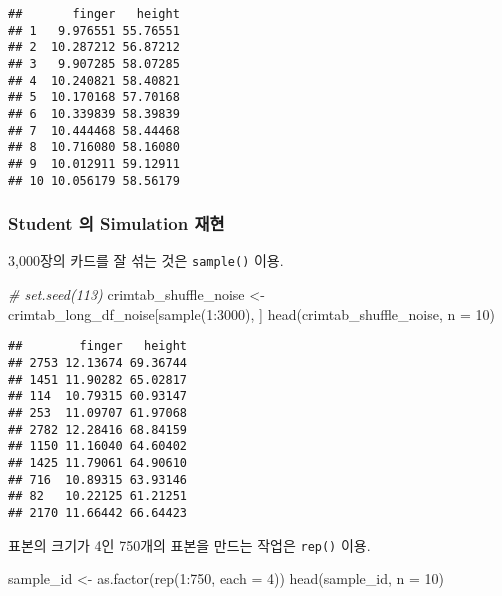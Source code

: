 \documentclass[
]{article}
\newenvironment{Shaded}{\begin{snugshade}}{\end{snugshade}}
\newcommand{\AttributeTok}[1]{\textcolor[rgb]{0.77,0.63,0.00}{#1}}
\newcommand{\CommentTok}[1]{\textcolor[rgb]{0.56,0.35,0.01}{\textit{#1}}}
\newcommand{\DecValTok}[1]{\textcolor[rgb]{0.00,0.00,0.81}{#1}}
\newcommand{\FunctionTok}[1]{\textcolor[rgb]{0.00,0.00,0.00}{#1}}
\newcommand{\NormalTok}[1]{#1}
\newcommand{\OtherTok}[1]{\textcolor[rgb]{0.56,0.35,0.01}{#1}}
\newcommand{\SpecialCharTok}[1]{\textcolor[rgb]{0.00,0.00,0.00}{#1}}
\begin{document}
\begin{verbatim}
##       finger   height
## 1   9.976551 55.76551
## 2  10.287212 56.87212
## 3   9.907285 58.07285
## 4  10.240821 58.40821
## 5  10.170168 57.70168
## 6  10.339839 58.39839
## 7  10.444468 58.44468
## 8  10.716080 58.16080
## 9  10.012911 59.12911
## 10 10.056179 58.56179
\end{verbatim}

\hypertarget{student-uxc758-simulation-uxc7acuxd604}{%
\subsubsection{Student 의 Simulation
재현}\label{student-uxc758-simulation-uxc7acuxd604}}

3,000장의 카드를 잘 섞는 것은 \texttt{sample()} 이용.

\begin{Shaded}
\begin{Highlighting}[]
\CommentTok{\# set.seed(113)}
\NormalTok{crimtab\_shuffle\_noise }\OtherTok{\textless{}{-}} 
\NormalTok{  crimtab\_long\_df\_noise[}\FunctionTok{sample}\NormalTok{(}\DecValTok{1}\SpecialCharTok{:}\DecValTok{3000}\NormalTok{), ]}
\FunctionTok{head}\NormalTok{(crimtab\_shuffle\_noise, }\AttributeTok{n =} \DecValTok{10}\NormalTok{)}
\end{Highlighting}
\end{Shaded}

\begin{verbatim}
##        finger   height
## 2753 12.13674 69.36744
## 1451 11.90282 65.02817
## 114  10.79315 60.93147
## 253  11.09707 61.97068
## 2782 12.28416 68.84159
## 1150 11.16040 64.60402
## 1425 11.79061 64.90610
## 716  10.89315 63.93146
## 82   10.22125 61.21251
## 2170 11.66442 66.64423
\end{verbatim}

표본의 크기가 4인 750개의 표본을 만드는 작업은 \texttt{rep()} 이용.

\begin{Shaded}
\begin{Highlighting}[]
\NormalTok{sample\_id }\OtherTok{\textless{}{-}} \FunctionTok{as.factor}\NormalTok{(}\FunctionTok{rep}\NormalTok{(}\DecValTok{1}\SpecialCharTok{:}\DecValTok{750}\NormalTok{, }\AttributeTok{each =} \DecValTok{4}\NormalTok{))}
\FunctionTok{head}\NormalTok{(sample\_id, }\AttributeTok{n =} \DecValTok{10}\NormalTok{)}
\end{Highlighting}
\end{Shaded}
\end{document}
